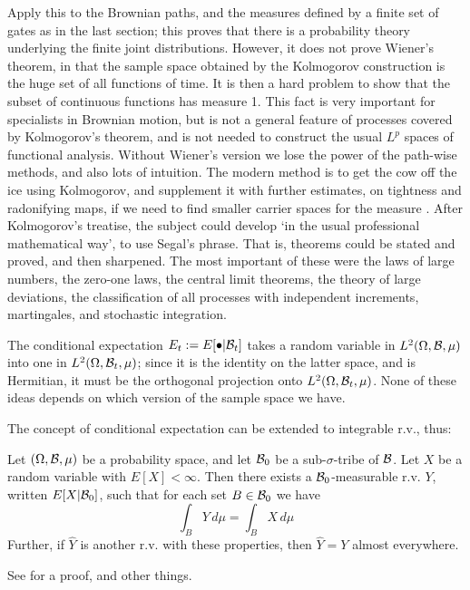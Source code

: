 Apply this to the Brownian paths, and the
measures defined by a finite set of gates as in the last section;
this proves
that there is a probability theory underlying the finite joint
distributions. However, it does not prove Wiener's theorem, in that the
sample space obtained by the Kolmogorov construction is the huge set of all
functions of time. It is then a hard problem to show that the subset
of continuous functions has measure 1. This fact is very important
for specialists in Brownian motion, but is not a general feature of
processes covered by Kolmogorov's theorem, and is not needed to construct
the usual $L^p$ spaces of functional analysis.
Without Wiener's version
we lose the power of the path-wise methods, and also lots of intuition.
The modern method is to get the cow off the ice using Kolmogorov, and
supplement it with further estimates, on tightness and radonifying maps,
if we need to find smaller carrier spaces for the measure
\cite{Gross,Schwartz}.
After Kolmogorov's treatise, the subject could develop `in the usual
professional mathematical way', to use Segal's phrase. That is, theorems
could be stated and proved, and then sharpened. The most important of these
were the laws of large numbers, the zero-one laws, the central limit
theorems,
the theory of large deviations, the classification of all processes with
independent increments, martingales, and stochastic integration.


The conditional
expectation $E_t:=E[\bullet|{\cal B}_t]$ takes a random variable in
$L^2(\Omega,{\cal B},\mu)$ into one in $L^2(\Omega,{\cal B}_t,\mu)$;
since it is the identity on the latter space, and is Hermitian,
it must be the orthogonal projection onto $L^2(\Omega,{\cal B}_t,\mu)$.
None of these ideas depends on which version of the sample space we have.


The concept of conditional expectation can be extended to integrable
r.v., thus:
\begin{definition}
Let $(\Omega,{\cal B},\mu)$ be a probability space, and let ${\cal B}_0$ be
a sub-$\sigma$-tribe of ${\cal B}$. Let $X$ be a random variable with
$E[X]<\infty$. Then there exists a ${\cal B}_0$-measurable r.v. $Y$,
written $E[X|{\cal B}_0]$, such that for each set $B\in{\cal B}_0$ we have
\begin{equation}
\int_BY\,d\mu=\int_BX\,d\mu
\end{equation}
Further, if $\hat{Y}$ is another r.v. with these properties, then
$\hat{Y}=Y$ almost everywhere.
\end{definition}
See \cite{Williams} for a proof, and other things.

